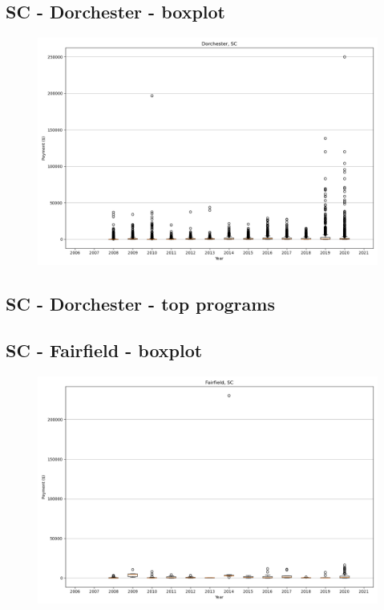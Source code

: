 \subsection*{SC - Dorchester - boxplot}
\begin{figure}[h]
\centering
\includegraphics[width=7in]{../output/boxplots/counties/Dorchester-SC_boxplot.png}
\end{figure}


\subsection*{SC - Dorchester - top programs}

\newpage
\subsection*{SC - Fairfield - boxplot}
\begin{figure}[h]
\centering
\includegraphics[width=7in]{../output/boxplots/counties/Fairfield-SC_boxplot.png}
\end{figure}


